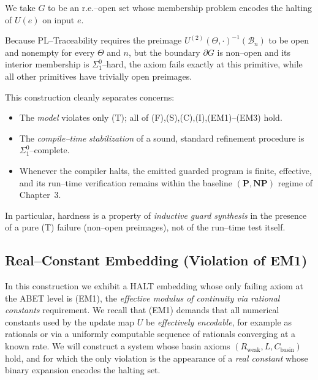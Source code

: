 \documentclass[12pt]{article}
\theoremstyle{definition}
\theoremstyle{plain}
\begin{document}
We take $G$ to be an r.e.–open set whose membership problem encodes the halting of $U(e)$ on input $e$. 

Because PL–Traceability requires the preimage $U^{(2)}(\Theta,\cdot)^{-1}(\mathcal B_n)$ to be open and nonempty for every $\Theta$ and $n$, but the boundary $\partial G$ is non–open and its interior membership is $\Sigma^0_1$–hard, the axiom fails exactly at this primitive, while all other primitives have trivially open preimages.

This construction cleanly separates concerns:
\begin{itemize}[itemsep=2pt, leftmargin=2em]
  \item The \emph{model} violates only (T); all of (F),(S),(C),(I),(EM1)–(EM3) hold.
  \item The \emph{compile–time} \emph{stabilization} of a sound, standard refinement procedure is \(\Sigma^0_1\)–complete.
  \item Whenever the compiler halts, the emitted guarded program is finite, effective, and its run–time verification remains within the baseline \((\mathbf P,\mathbf{NP})\) regime of Chapter~3.
\end{itemize}
In particular, hardness is a property of \emph{inductive guard synthesis} in the presence of a pure (T) failure (non–open preimages), not of the run–time test itself.



\subsection{Real–Constant Embedding (Violation of EM1)}
\label{sec:EM1-violation}

In this construction we exhibit a HALT embedding whose only failing axiom at the ABET level is \textup{(EM1)}, the \emph{effective modulus of continuity via rational constants} requirement.
We recall that \textup{(EM1)} demands that all numerical constants used by the update map $U$ be \emph{effectively encodable}, for example as rationals or via a uniformly computable sequence of rationals converging at a known rate. 
We will construct a system whose basin axioms $(R_{\mathrm{weak}},L,C_{\mathrm{basin}})$ hold, and for which the only violation is the appearance of a \emph{real constant} whose binary expansion encodes the halting set.
\end{document}
